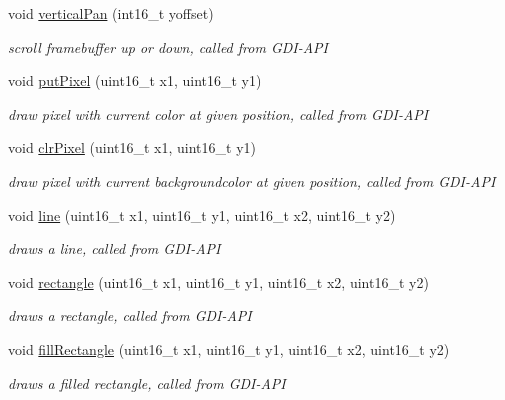 \begin{CompactItemize}
void \hyperlink{group__graphic__device_g3a3cd779058c4bb5b8b03e316f58ed16}{verticalPan} (int16\_\-t yoffset)
\begin{CompactList}\small\item\em scroll framebuffer up or down, called from GDI-API \item\end{CompactList}\item 
void \hyperlink{group__graphic__device_gb7831d44ca8d752c86a1953b2b898e5f}{putPixel} (uint16\_\-t x1, uint16\_\-t y1)
\begin{CompactList}\small\item\em draw pixel with current color at given position, called from GDI-API \item\end{CompactList}\item 
void \hyperlink{group__graphic__device_gb5f226f1613f7f70a1e068c5fa2e4b56}{clrPixel} (uint16\_\-t x1, uint16\_\-t y1)
\begin{CompactList}\small\item\em draw pixel with current backgroundcolor at given position, called from GDI-API \item\end{CompactList}\item 
void \hyperlink{group__graphic__device_gbae4230e0d7bc64a2f8fba6c6175eb87}{line} (uint16\_\-t x1, uint16\_\-t y1, uint16\_\-t x2, uint16\_\-t y2)
\begin{CompactList}\small\item\em draws a line, called from GDI-API \item\end{CompactList}\item 
void \hyperlink{group__graphic__device_g6d8d01808fb00f5848e16621995a6657}{rectangle} (uint16\_\-t x1, uint16\_\-t y1, uint16\_\-t x2, uint16\_\-t y2)
\begin{CompactList}\small\item\em draws a rectangle, called from GDI-API \item\end{CompactList}\item 
void \hyperlink{group__graphic__device_g777ea1e70848dcacfa26275e00527aae}{fillRectangle} (uint16\_\-t x1, uint16\_\-t y1, uint16\_\-t x2, uint16\_\-t y2)
\begin{CompactList}\small\item\em draws a filled rectangle, called from GDI-API \item\end{CompactList}\item 

\end{CompactItemize}
